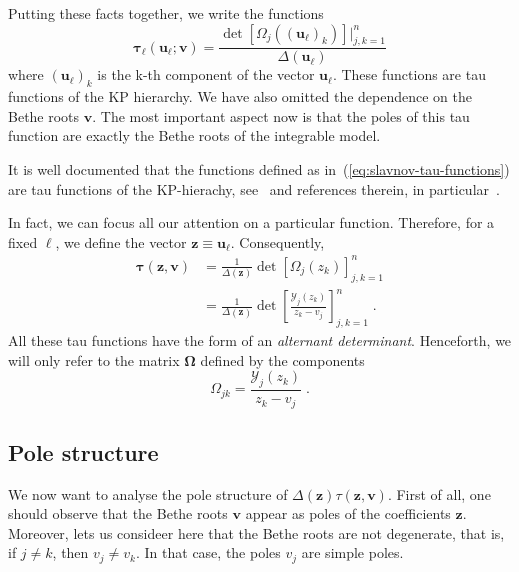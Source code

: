 \documentclass[a4paper,11pt]{amsart}
\begin{document}
Putting these facts together, we write the functions
\begin{equation}
\label{eq:slavnov-tau-functions}
  \bm{\tau}_\ell(\bm{u}_\ell; \bm{v}) = \frac{\det [\Omega_j((\bm{u}_\ell)_k)]|_{j,k=1}^n }{\Delta(\bm{u}_\ell)} 
\end{equation}
where \((\bm{u}_\ell)_k \) is the k-th component of the vector
\(\bm{u}_\ell\). These functions are tau functions of the KP
hierarchy.  We have also omitted the dependence on the Bethe roots
\(\bm{v}\). The most important aspect now is that the poles of this
tau function are exactly the Bethe roots of the integrable model.

It is well documented that the functions defined as
in~(\ref{eq:slavnov-tau-functions}) are tau functions of the
KP-hierachy, see~\cite{Araujo:2021ghu} and references therein, in
particular~\cite{Kharchev:1991cy}.

In fact, we can focus all our attention on a particular function. Therefore,
for a fixed \(\ell\), we define the vector \( \bm{z} \equiv \bm{u}_\ell\).
Consequently, 
\begin{equation}
\begin{split}
\label{eq:tau-function}
  \bm{\tau}(\bm{z}, \bm{v})
  & = \frac{1}{\Delta(\bm{z})} \det[\Omega_j(z_k) ]_{j,k=1}^n \\
  & = \frac{1}{\Delta(\bm{z})} \det\left[\frac{\mathcal{Y}_j(z_k)}{z_k - v_j} \right]_{j,k=1}^n  \; .
\end{split}
\end{equation}
All these tau functions have the form of an \emph{alternant
determinant}.  Henceforth, we will only refer to the matrix
\(\bm{\Omega}\) defined by the components
\begin{equation}
  \label{eq:omega-matrix}
  \Omega_{jk} = \frac{\mathcal{Y}_j(z_k)}{z_k - v_j}\; .
\end{equation}

\subsection{Pole structure}

We now want to analyse the pole structure of
\(\Delta(\bm{z})\tau(\bm{z}, \bm{v})\).  First of all, one should
observe that the Bethe roots \(\bm{v}\) appear as poles of the
coefficients \(\bm{z}\). Moreover, lets us consideer here that the
Bethe roots are not degenerate, that is, if \(j \neq k\), then \(v_j
\neq v_k\). In that case, the poles \(v_j\) are simple poles.
\end{document}
